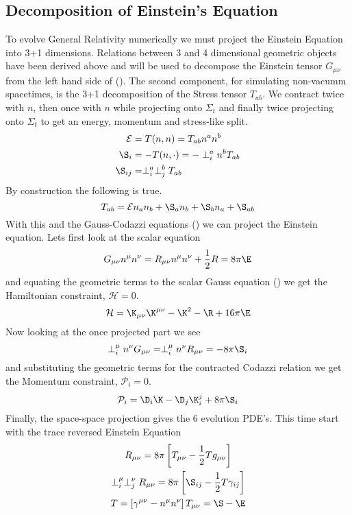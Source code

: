 \subsection{Decomposition of Einstein's Equation}
To evolve General Relativity numerically we must project the Einstein Equation into 3+1 dimensions. Relations between 3 and 4 dimensional geometric objects have been derived above and will be used to decompose the Einstein tensor $G_{\mu\nu}$ from the left hand side of (). The second component, for simulating non-vacumm spacetimes, is the 3+1 decomposition of the Stress tensor $T_{ab}$. We contract twice with $n$, then once with $n$ while projecting onto $\Sigma_t$ and finally twice projecting onto $\Sigma_t$ to get an energy, momentum and stress-like split.
\begin{align} \mathcal{E} &= T(n,n) = T_{ab}n^an^b\\
 \S_i &= -T(n,\cdot) = -\perp_i^a n^b T_{ab}\\
\S_{ij} &= \perp^a_i\perp^b_j T_{ab}\end{align}
By construction the following is true.
\[ T_{ab} = \mathcal{E} n_a n_b + \S_a n_b + \S_b n_a + \S_{ab}\]
With this and the Gauss-Codazzi equations () we can project the Einstein equation. Lets first look at the scalar equation
\[ G_{\mu\nu}n^\mu n^\nu = R_{\mu\nu}n^\mu n^\nu + \frac{1}{2}R = 8\pi \E\]
and equating the geometric terms to the scalar Gauss equation () we get the Hamiltonian constraint, $\mathcal{H}=0$.
\begin{equation}\mathcal{H} = \K_{\mu\nu}\K^{\mu\nu}-\K^2 -\R + 16\pi \E  \end{equation}
Now looking at the once projected part we see
\[ \perp^\mu_i n^\nu G_{\mu\nu} =  \perp^\mu_i n^\nu R_{\mu\nu} = -8\pi\S_i\]
and substituting the geometric terms for the contracted Codazzi relation we get the Momentum constraint, $\mathcal{P}_i = 0$.
\begin{equation} \mathcal{P}_i = \D_i \K - \D_j\K^j_i  + 8\pi \S_i\end{equation}
Finally, the space-space projection gives the 6 evolution PDE's. This time start with the trace reversed Einstein Equation
\begin{gather*} R_{\mu\nu} = 8 \pi \left[T_{\mu\nu} - \frac{1}{2}Tg_{\mu\nu}\right]\\
\perp^\mu_i\perp^\nu_jR_{\mu\nu} = 8 \pi \left[\S_{ij} - \frac{1}{2}T\gamma_{ij}\right]\\
T = \left[ \gamma^{\mu\nu} - n^\mu n^\nu\right]T_{\mu\nu} = \S-\E\end{gather*}
